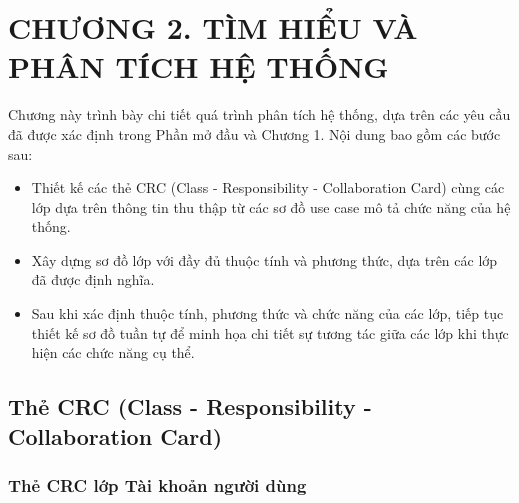 \section*{CHƯƠNG 2. TÌM HIỂU VÀ PHÂN TÍCH HỆ THỐNG}
\setcounter{section}{2}
\setcounter{subsection}{0} %
\setcounter{table}{0} %
\setcounter{figure}{0} %
Chương này trình bày chi tiết quá trình phân tích hệ thống, dựa trên các yêu cầu đã được xác định trong Phần mở đầu và Chương 1. Nội dung bao gồm các bước sau:\begin{adjustwidth}{1.5em}{}
	\begin{itemize}
		\item Thiết kế các thẻ CRC (Class - Responsibility - Collaboration Card) cùng các lớp dựa trên thông tin thu thập từ các sơ đồ use case mô tả chức năng của hệ thống.
		\item Xây dựng sơ đồ lớp với đầy đủ thuộc tính và phương thức, dựa trên các lớp đã được định nghĩa.
		\item Sau khi xác định thuộc tính, phương thức và chức năng của các lớp, tiếp tục thiết kế sơ đồ tuần tự để minh họa chi tiết sự tương tác giữa các lớp khi thực hiện các chức năng cụ thể.
	\end{itemize}
\end{adjustwidth}
\subsection{Thẻ CRC (Class - Responsibility - Collaboration Card)}

\subsubsection{Thẻ CRC lớp Tài khoản người dùng}

